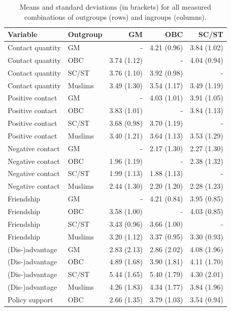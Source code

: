 \documentclass[12pt, a4paper]{article}
\begin{document}
\begin{table}[!hp]
\centering
{}
\caption{Means and standard deviations (in brackets) for all measured combinations of outgroups (rows) and ingroups (columns).}
\small	
\begin{tabular}{llrrr} \toprule
Variable & Outgroup & GM & OBC & SC/ST \\ \midrule \addlinespace
  Contact quantity & GM & - & 4.21 (0.96) & 3.84 (1.02) \\ 
  Contact quantity & OBC & 3.74 (1.12) & - & 4.04 (0.94) \\ 
  Contact quantity & SC/ST & 3.76 (1.10) & 3.92 (0.98) & - \\ 
  Contact quantity & Muslims & 3.49 (1.30) & 3.54 (1.17) & 3.49 (1.19) \\ \addlinespace
  Positive contact & GM & - & 4.03 (1.01) & 3.91 (1.05) \\ 
  Positive contact & OBC & 3.83 (1.01) & - & 3.84 (1.13) \\ 
  Positive contact & SC/ST & 3.68 (0.98) & 3.70 (1.19) & - \\ 
  Positive contact & Muslims & 3.40 (1.21) & 3.64 (1.13) & 3.53 (1.29) \\ \addlinespace
  Negative contact & GM & - & 2.17 (1.30) & 2.27 (1.30) \\ 
  Negative contact & OBC & 1.96 (1.19) & - & 2.38 (1.32) \\ 
  Negative contact & SC/ST & 1.99 (1.13) & 1.88 (1.13) & - \\ 
  Negative contact & Muslims & 2.44 (1.30) & 2.20 (1.20) & 2.28 (1.23) \\ \addlinespace
  Friendship & GM & - & 4.21 (0.84) & 3.95 (0.85) \\ 
  Friendship & OBC & 3.58 (1.00) & - & 4.03 (0.85) \\ 
  Friendship & SC/ST & 3.43 (0.96) & 3.66 (1.00) & - \\ 
  Friendship & Muslims & 3.20 (1.12) & 3.37 (0.95) & 3.30 (0.93) \\ \addlinespace
  (Dis-)advantage & GM & 2.83 (2.13) & 2.86 (2.02) & 4.08 (1.96) \\ 
  (Dis-)advantage & OBC & 4.89 (1.68) & 3.90 (1.81) & 4.11 (1.70) \\ 
  (Dis-)advantage & SC/ST & 5.44 (1.65) & 5.40 (1.79) & 4.30 (2.01) \\ 
  (Dis-)advantage & Muslims & 4.26 (1.83) & 4.34 (1.77) & 3.84 (1.96) \\ \addlinespace
  Policy support & OBC & 2.66 (1.35) & 3.79 (1.03) & 3.54 (0.94) \\ 

\end{tabular}
\end{table}
\end{document}
